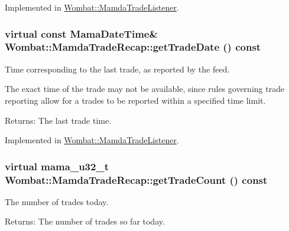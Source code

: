 Implemented in \hyperlink{classWombat_1_1MamdaTradeListener_a8b74cc931fd2f5453ad7f393145402e}{Wombat::Mamda\-Trade\-Listener}.\hypertarget{classWombat_1_1MamdaTradeRecap_c613c40f5f339c6c7508000c92cda65c}{
\subsubsection[getTradeDate]{\setlength{\rightskip}{0pt plus 5cm}virtual const Mama\-Date\-Time\& Wombat::Mamda\-Trade\-Recap::get\-Trade\-Date () const}}
\label{classWombat_1_1MamdaTradeRecap_c613c40f5f339c6c7508000c92cda65c}


Time corresponding to the last trade, as reported by the feed. 

The exact time of the trade may not be available, since rules governing trade reporting allow for a trades to be reported within a specified time limit.

\begin{Desc}
\item[Returns:]The last trade time. \end{Desc}


Implemented in \hyperlink{classWombat_1_1MamdaTradeListener_078b15ccd771aae1890bf26e0471c0a6}{Wombat::Mamda\-Trade\-Listener}.\hypertarget{classWombat_1_1MamdaTradeRecap_16854299d7b7266d833c7d8ce405baf2}{
\subsubsection[getTradeCount]{\setlength{\rightskip}{0pt plus 5cm}virtual mama\_\-u32\_\-t Wombat::Mamda\-Trade\-Recap::get\-Trade\-Count () const}}
\label{classWombat_1_1MamdaTradeRecap_16854299d7b7266d833c7d8ce405baf2}


The number of trades today. 

\begin{Desc}
\item[Returns:]The number of trades so far today. \end{Desc}


